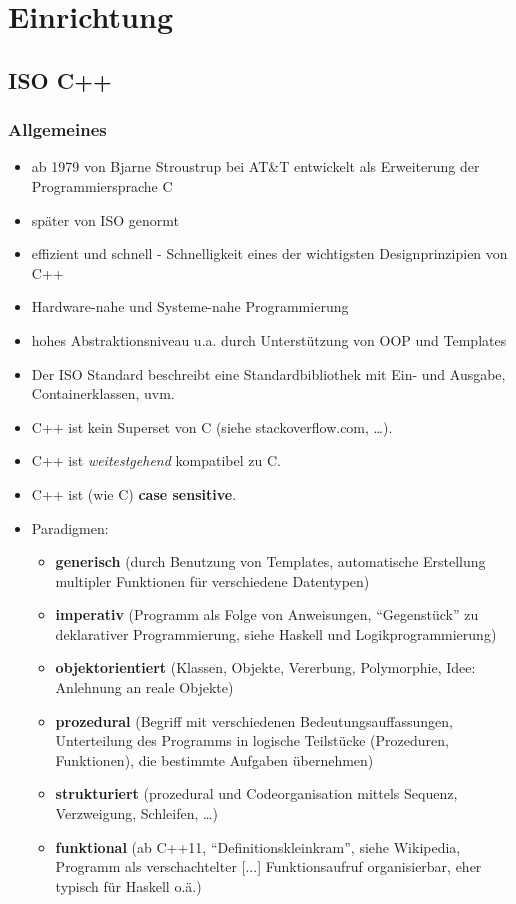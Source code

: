 \documentclass[a4paper]{report}
\begin{document}
\tableofcontents

\chapter{Einrichtung}

\section{ISO C++}

\subsection{Allgemeines}
\begin{itemize}
\item ab 1979 von Bjarne Stroustrup bei AT\&T entwickelt als Erweiterung der Programmiersprache C
\item später von ISO genormt
\vspace{2ex}
\item effizient und schnell - Schnelligkeit eines der wichtigsten Designprinzipien von C++
\item Hardware-nahe und Systeme-nahe Programmierung
\item hohes Abstraktionsniveau u.a. durch Unterstützung von OOP und Templates
\item Der ISO Standard beschreibt eine Standardbibliothek mit Ein- und Ausgabe, Containerklassen, uvm.
\item C++ ist kein Superset von C (siehe stackoverflow.com, \dots).
\item C++ ist \textit{weitestgehend} kompatibel zu C.
\item C++ ist (wie C) \textbf{case sensitive}.
\vspace{2ex}

\item Paradigmen:
	\begin{itemize}
		\item \textbf{generisch} (durch Benutzung von Templates, automatische Erstellung multipler Funktionen für verschiedene Datentypen)
		\item \textbf{imperativ} (Programm als Folge von Anweisungen, "`Gegenstück"' zu deklarativer Programmierung, siehe Haskell und Logikprogrammierung)
		\item \textbf{objektorientiert} (Klassen, Objekte, Vererbung, Polymorphie, Idee: Anlehnung an reale Objekte)
		\item \textbf{prozedural} (Begriff mit verschiedenen Bedeutungsauffassungen, Unterteilung des Programms in logische Teilstücke (Prozeduren, Funktionen), die bestimmte Aufgaben übernehmen)
		\item \textbf{strukturiert} (prozedural und Codeorganisation mittels Sequenz, Verzweigung, Schleifen, \dots )
		\item \textbf{funktional} (ab C++11, "`Definitionskleinkram"', siehe Wikipedia, Programm als verschachtelter [...] Funktionsaufruf organisierbar, eher typisch für Haskell o.ä.)
	\end{itemize}
\end{itemize}
\end{document}
